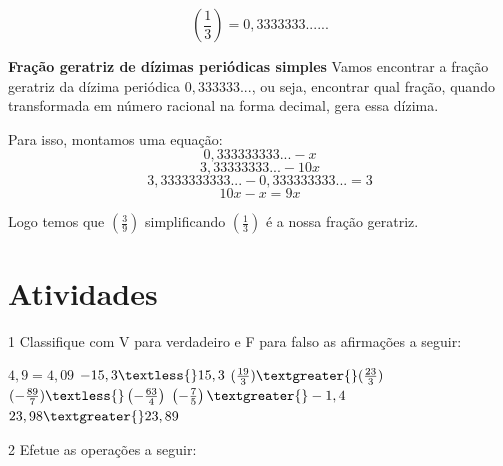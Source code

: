 {$$(\frac{1}{3}) = 0,3333333......$$

\textbf{Fração geratriz de dízimas periódicas simples}\quad
Vamos encontrar a fração geratriz da dízima periódica $0,333333...$, ou
seja, encontrar qual fração, quando transformada em número racional na
forma decimal, gera essa dízima.

Para isso, montamos uma equação:
$$0,333333333... - x$$
$$3,33333333... - 10x$$
$$3,3333333333... - 0,333333333... = 3$$
$$10x - x = 9x$$

Logo temos que $(\frac{3}{9})$ simplificando $(\frac{1}{3})$ é a nossa
fração geratriz.
}



\section{Atividades}

\num{1} Classifique com V para verdadeiro e F para falso as afirmações a
seguir:

\begin{boxlist}
 $4,9 = 4,09$
 $-15,3 \textless{} 15,3$
 $(\frac{19}{3}) \textgreater{} (\frac{23}{3})$
 $(-\frac{89}{7}) \textless{} \left(- \frac{63}{4}\right )$
 $\left(- \frac{7}{5}\right ) \textgreater{} -1,4$
 $23,98 \textgreater{} 23,89$
\end{boxlist}



\num{2} Efetue as operações a seguir:


